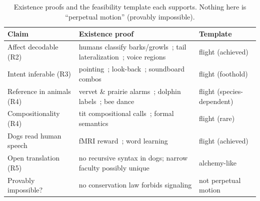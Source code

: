 \begin{table}[htbp]
\centering
\caption{Existence proofs and the feasibility template each supports.
Nothing here is ``perpetual motion'' (provably impossible).}
\label{tab:proofs}
\footnotesize
\setlength{\tabcolsep}{4pt}
\begin{tabular}{@{}p{3.4cm}p{8.0cm}p{2.2cm}@{}}
\toprule
\textbf{Claim} & \textbf{Existence proof} & \textbf{Template} \\
\midrule
Affect decodable (R2) & humans classify barks/growls~\cite{pongracz2005barks,farago2017growls}; tail lateralization~\cite{quaranta2007tail}; voice regions~\cite{andics2014voice} & flight (achieved) \\
Intent inferable (R3) & pointing~\cite{soproni2001comprehension}; look-back~\cite{miklosi2003lookback}; soundboard combos~\cite{bastos2024scirep} & flight (foothold) \\
Reference in animals (R4) & vervet \& prairie alarms~\cite{seyfarth1980vervet,slobodchikoff2009prairie}; dolphin labels~\cite{janik1998whistles}; bee dance~\cite{vonfrisch1967dance} & flight (species-dependent) \\
Compositionality (R4) & tit compositional calls~\cite{suzuki2016compositional}; formal semantics~\cite{schlenker2016formal} & flight (rare) \\
Dogs read human speech & fMRI reward~\cite{berns2012fmri}; word learning~\cite{kaminski2004rico,pilley2011chaser} & flight (achieved) \\
Open translation (R5) & no recursive syntax in dogs; narrow faculty possibly unique~\cite{hauser2002faculty,chomsky1957syntactic} & alchemy-like \\
Provably impossible? & no conservation law forbids signaling & not perpetual motion \\
\bottomrule
\end{tabular}
\end{table}
